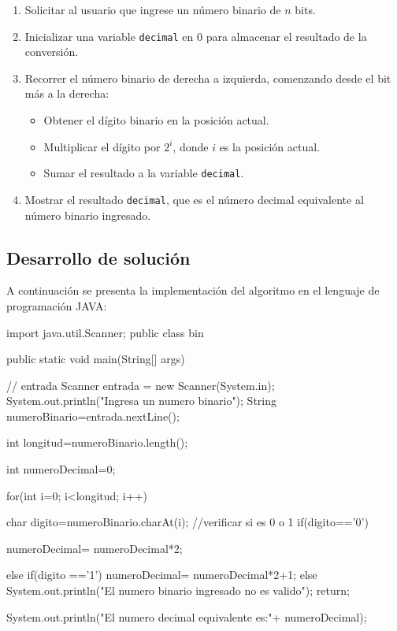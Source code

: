 \begin{enumerate}
  \item Solicitar al usuario que ingrese un número binario de $n$ bits.
  \item Inicializar una variable \texttt{decimal} en 0 para almacenar el resultado de la conversión.
  \item Recorrer el número binario de derecha a izquierda, comenzando desde el bit más a la derecha:
    \begin{itemize}
      \item Obtener el dígito binario en la posición actual.
      \item Multiplicar el dígito por $2^i$, donde $i$ es la posición actual.
      \item Sumar el resultado a la variable \texttt{decimal}.
    \end{itemize}
  \item Mostrar el resultado \texttt{decimal}, que es el número decimal equivalente al número binario ingresado.
\end{enumerate}

\subsection{Desarrollo de solución}

A continuación se presenta la implementación del algoritmo en el lenguaje de programación JAVA:

\begin{javaCode}
import java.util.Scanner;
public class bin {

    public static void main(String[] args) {
        // entrada
        Scanner entrada = new Scanner(System.in);
        System.out.println("Ingresa un numero binario");
        String numeroBinario=entrada.nextLine();
        
        int longitud=numeroBinario.length();
        
        int numeroDecimal=0;
        
        for(int i=0; i<longitud; i++){
            char digito=numeroBinario.charAt(i);
            //verificar si es 0 o 1
            if(digito=='0'){
                numeroDecimal= numeroDecimal*2;
                
            
            }else if(digito =='1'){
                numeroDecimal= numeroDecimal*2+1;
            }else{
                System.out.println("El numero binario ingresado no es valido");
                return;
            }
        }
        System.out.println("El numero decimal equivalente es:"+ numeroDecimal);
    }
}

\end{javaCode}

